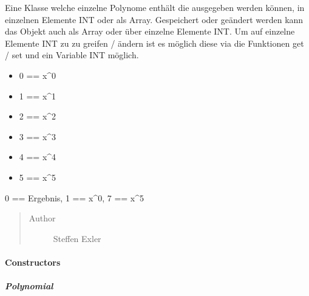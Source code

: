 \documentclass[letterpaper,10pt,ngerman]{sphinxmanual}
\begin{document}
\begin{fulllineitems}
\label{com/linuxluigi/polynomial/Polynomial:com.linuxluigi.polynomial.Polynomial}
Eine Klasse welche einzelne Polynome enthält die ausgegeben werden können, in einzelnen Elemente INT oder als Array. Gespeichert oder geändert werden kann das Objekt auch als Array oder über einzelne Elemente INT. Um auf einzelne Elemente INT zu zu greifen / ändern ist es möglich diese via die Funktionen get / set und ein Variable INT möglich.
\begin{itemize}
\item {} 
0 == x\textasciicircum{}0

\item {} 
1 == x\textasciicircum{}1

\item {} 
2 == x\textasciicircum{}2

\item {} 
3 == x\textasciicircum{}3

\item {} 
4 == x\textasciicircum{}4

\item {} 
5 == x\textasciicircum{}5

\end{itemize}

0 == Ergebnis, 1 == x\textasciicircum{}0, 7 == x\textasciicircum{}5
\begin{quote}\begin{description}
\item[{Author}] \leavevmode
Steffen Exler

\end{description}\end{quote}

\end{fulllineitems}



\paragraph{Constructors}
\label{com/linuxluigi/polynomial/Polynomial:constructors}

\subparagraph{Polynomial}
\label{com/linuxluigi/polynomial/Polynomial:id1}
\end{document}
